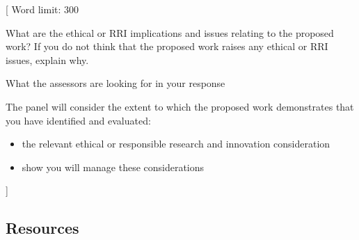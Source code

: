 \documentclass{article}
\newcommand{\desc}[1]{{\leavevmode\color{blue}[#1]}}
\begin{document}
\desc{
Word limit: 300

What are the ethical or RRI implications and issues relating to the proposed
work? If you do not think that the proposed work raises any ethical or RRI
issues, explain why.

What the assessors are looking for in your response

The panel will consider the extent to which the proposed work demonstrates that
you have identified and evaluated:

\begin{itemize}

    \item the relevant ethical or responsible research and innovation consideration

    \item show you will manage these considerations

\end{itemize}
}

% 

\subsection{Resources}
\end{document}
